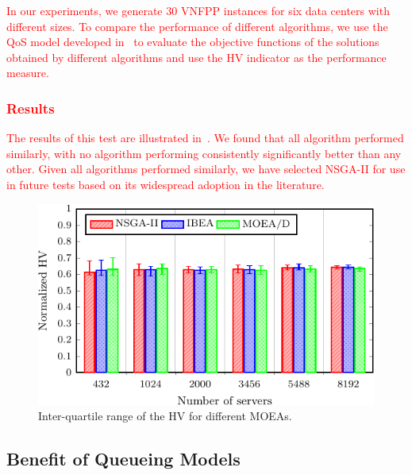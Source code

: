 \textcolor{red}{
In our experiments, we generate $30$ VNFPP instances for six data centers with different sizes. To compare the performance of different algorithms, we use the QoS model developed in~ to evaluate the objective functions of the solutions obtained by different algorithms and use the HV indicator as the performance measure.
}

\textcolor{red}{
\subsubsection{Results}
The results of this test are illustrated in~. We found that all algorithm performed similarly, with no algorithm performing consistently significantly better than any other. Given all algorithms performed similarly, we have selected NSGA-II for use in future tests based on its widespread adoption in the literature. 
}

\begin{figure}[t!]
    \centering
    \includegraphics[width=\linewidth]{graphs/moeas/comparison-crop}
    \caption{Inter-quartile range of the HV for different MOEAs.}
    \label{fig:moea_comparison}
\end{figure}

\vspace{0.5em}
\noindent
{}

\subsection{Benefit of Queueing Models}
\label{sec:model_benefit}


